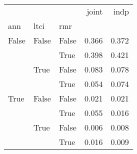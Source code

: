 \begin{tabular}{lllrr}
\toprule
     &      &      &  joint &   indp \\
ann & ltci & rmr &        &        \\
\midrule
False & False & False &  0.366 &  0.372 \\
     &      & True &  0.398 &  0.421 \\
     & True & False &  0.083 &  0.078 \\
     &      & True &  0.054 &  0.074 \\
True & False & False &  0.021 &  0.021 \\
     &      & True &  0.055 &  0.016 \\
     & True & False &  0.006 &  0.008 \\
     &      & True &  0.016 &  0.009 \\
\bottomrule
\end{tabular}
